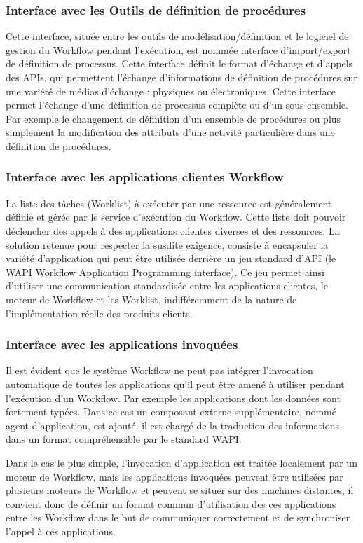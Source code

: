 \subsubsection{Interface avec les Outils de définition de procédures }
Cette interface, située entre les outils de modélisation/définition et le logiciel de gestion
du Workflow pendant l’exécution, est nommée interface d’import/export de définition de processus. Cette interface définit le format d’échange et d’appels des APIs, qui permettent
l'échange d'informations de définition de procédures sur une variété de médias d'échange :
physiques ou électroniques. Cette interface permet l'échange d'une définition de processus
complète ou d’un sous-ensemble. Par exemple le changement de définition d’un ensemble de
procédures ou plus simplement la modification des attributs d'une activité particulière dans
une définition de procédures. 

\subsubsection{Interface avec les applications clientes Workflow }
La liste des tâches (Worklist) à exécuter par une ressource est généralement définie et gérée par le service d’exécution du Workflow. Cette liste doit pouvoir déclencher des appels à
des applications clientes diverses et des ressources. La solution retenue pour respecter la susdite exigence, consiste à encapsuler la variété d’application qui peut être utilisée derrière un jeu standard d'API (le WAPI Workflow Application Programming interface). Ce jeu permet ainsi d’utiliser une communication standardisée entre les applications clientes, le moteur de Workflow et les Worklist, indifféremment de la nature de l’implémentation réelle des produits
clients. 
\subsubsection{Interface avec les applications invoquées}
Il est évident que le système Workflow ne peut pas intégrer l’invocation automatique de
toutes les applications qu’il peut être amené à utiliser pendant l’exécution d’un Workflow. Par
exemple les applications dont les données sont fortement typées. Dans ce cas un composant
externe supplémentaire, nommé agent d’application, est ajouté, il est chargé de la traduction
des informations dans un format compréhensible par le standard WAPI. 

Dans le cas le plus simple, l'invocation d'application est traitée localement par un moteur
de Workflow, mais les applications invoquées peuvent être utilisées par plusieurs moteurs de
Workflow et peuvent se situer sur des machines distantes, il convient donc de définir un format commun d’utilisation des ces applications entre les Workflow dans le but de communiquer correctement et de synchroniser l’appel à ces applications. 

